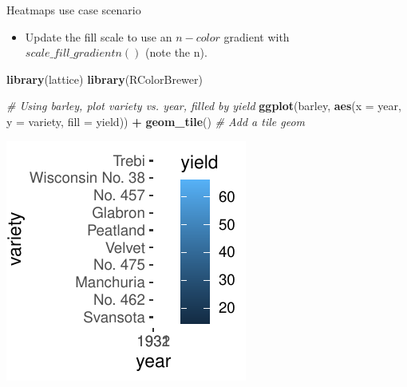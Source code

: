 \documentclass[
  ignorenonframetext,
]{beamer}
\newenvironment{Shaded}{\begin{snugshade}}{\end{snugshade}}
\newcommand{\AttributeTok}[1]{\textcolor[rgb]{0.13,0.29,0.53}{#1}}
\newcommand{\CommentTok}[1]{\textcolor[rgb]{0.56,0.35,0.01}{\textit{#1}}}
\newcommand{\FunctionTok}[1]{\textcolor[rgb]{0.13,0.29,0.53}{\textbf{#1}}}
\newcommand{\NormalTok}[1]{#1}
\newcommand{\SpecialCharTok}[1]{\textcolor[rgb]{0.81,0.36,0.00}{\textbf{#1}}}
\providecommand{\tightlist}{%
  \setlength{\itemsep}{0pt}\setlength{\parskip}{0pt}}
\begin{document}
\begin{frame}[fragile]{Heatmaps use case scenario}
\label{heatmaps-use-case-scenario-7}
\begin{itemize}
\tightlist
\item
  Update the fill scale to use an \(n-color\) gradient with
  \(scale\_fill\_gradientn()\) (note the n).
\end{itemize}


\begin{Shaded}
\begin{Highlighting}[]
\FunctionTok{library}\NormalTok{(lattice)}
\FunctionTok{library}\NormalTok{(RColorBrewer)}

\CommentTok{\# Using barley, plot variety vs. year, filled by yield}
\FunctionTok{ggplot}\NormalTok{(barley, }\FunctionTok{aes}\NormalTok{(}\AttributeTok{x =}\NormalTok{ year, }\AttributeTok{y =}\NormalTok{ variety, }\AttributeTok{fill =}\NormalTok{ yield)) }\SpecialCharTok{+} \FunctionTok{geom\_tile}\NormalTok{()  }\CommentTok{\# Add a tile geom}
\end{Highlighting}
\end{Shaded}

\begin{center}\includegraphics[width=0.5\linewidth]{Figs/unnamed-chunk-114-1} \end{center}
\end{frame}
\end{document}
